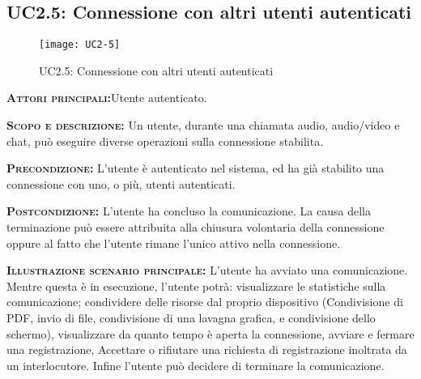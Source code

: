 \subsection{UC2.5: Connessione con altri utenti autenticati}
\begin{figure}[h!]
\centering
\texttt{[image: UC2-5]}
\caption{UC2.5: Connessione con altri utenti autenticati}\label{UC2.5}
\end{figure}
\begin{description}
\item{\scshape\bfseries Attori principali:}Utente autenticato.
\item{\scshape\bfseries Scopo e descrizione:} Un utente, durante una chiamata audio, audio/video e chat, può eseguire diverse operazioni sulla connessione stabilita.
\item{\scshape\bfseries Precondizione:} L'utente è autenticato nel sistema, ed ha già stabilito una connessione con uno, o più, utenti autenticati.
\item{\scshape\bfseries Postcondizione:} L'utente ha concluso la comunicazione. La causa della terminazione può essere attribuita alla chiusura volontaria della connessione oppure al fatto che l'utente rimane l'unico attivo nella connessione.
\item{\scshape\bfseries Illustrazione scenario principale:} L'utente ha avviato una comunicazione. Mentre questa è in esecuzione, l'utente potrà: visualizzare le statistiche sulla comunicazione; condividere delle risorse dal proprio dispositivo (Condivisione di PDF, invio di file, condivisione di una lavagna grafica, e condivisione dello schermo), visualizzare da quanto tempo è aperta la connessione, avviare e fermare una registrazione, Accettare o rifiutare una richiesta di registrazione inoltrata da un interlocutore. Infine l'utente può decidere di terminare la comunicazione.
\end{description}

